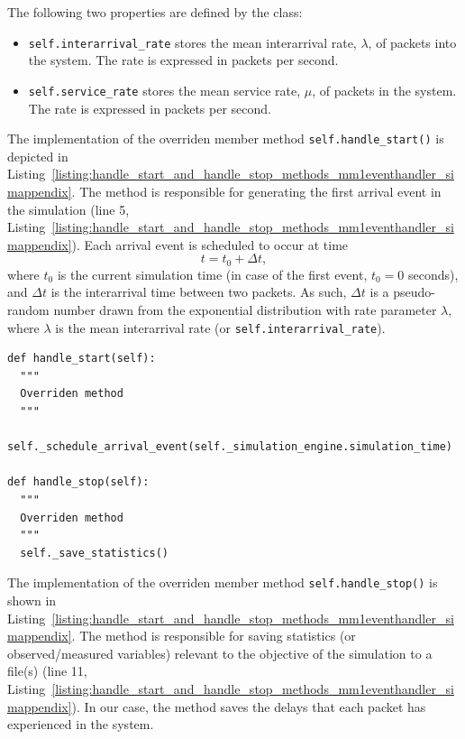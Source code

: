 The following two properties are defined by the class:
\begin{itemize}
  \item \lstinline{self.interarrival_rate} stores the mean interarrival rate, $\lambda$, of packets into the system. The rate is expressed in packets per second.
  \item \lstinline{self.service_rate} stores the mean service rate, $\mu$, of packets in the system. The rate is expressed in packets per second.
\end{itemize}

The implementation of the overriden member method \lstinline{self.handle_start()} is depicted in Listing~\ref{listing:handle_start_and_handle_stop_methods_mm1eventhandler_simappendix}. The method is responsible for generating the first arrival event in the simulation (line 5, Listing~\ref{listing:handle_start_and_handle_stop_methods_mm1eventhandler_simappendix}). Each arrival event is scheduled to occur at time
\begin{equation*}
  t = t_0 + \Delta t,
\end{equation*}
where $t_0$ is the current simulation time (in case of the first event, $t_0=0$ seconds), and $\Delta t$ is the interarrival time between two packets. As such, $\Delta t$ is a pseudo-random number drawn from the exponential distribution with rate parameter $\lambda$, where $\lambda$ is the mean interarrival rate (or \lstinline{self.interarrival_rate}).

\begin{lstlisting}[caption=\lstinline{self.handle_start()} and \lstinline{self.handle_stop()} member methods of the \lstinline{MM1EventHandler} class, label=listing:handle_start_and_handle_stop_methods_mm1eventhandler_simappendix]
def handle_start(self):
  """
  Overriden method
  """
  self._schedule_arrival_event(self._simulation_engine.simulation_time)

def handle_stop(self):
  """
  Overriden method
  """
  self._save_statistics()
\end{lstlisting}

The implementation of the overriden member method \lstinline{self.handle_stop()} is shown in Listing~\ref{listing:handle_start_and_handle_stop_methods_mm1eventhandler_simappendix}. The method is responsible for saving statistics (or observed/measured variables) relevant to the objective of the simulation to a file(s) (line 11, Listing~\ref{listing:handle_start_and_handle_stop_methods_mm1eventhandler_simappendix}). In our case, the method saves the delays that each packet has experienced in the system.

